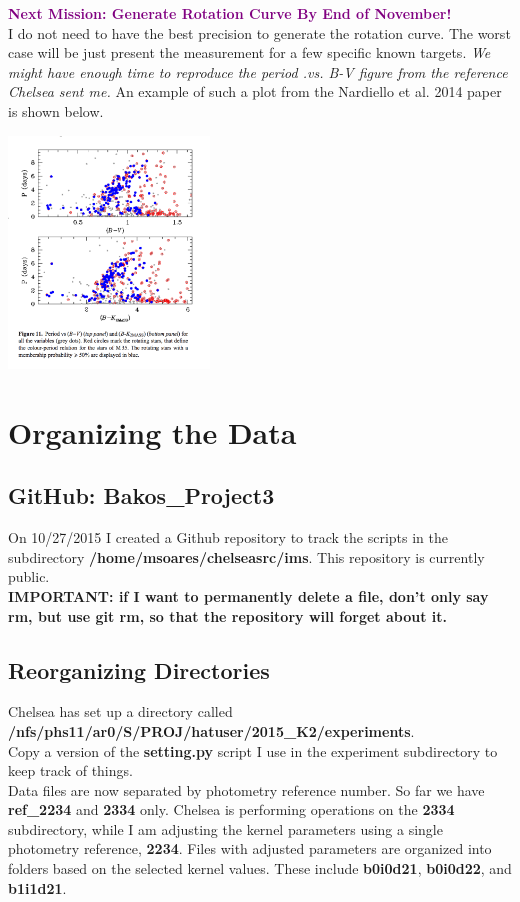 \documentclass[11pt,letterpaper]{book} %
\begin{document}
\textcolor{purple}{\textbf{Next Mission: Generate Rotation Curve By End of November!}}\\ 
I do  not need to have the best precision to generate the rotation curve. The worst case will be just present the measurement for a few specific known targets. \textit{We might have enough time to reproduce the period .vs. B-V figure from the reference Chelsea sent me.} An example of such a plot from the Nardiello et al. 2014 paper is shown below. \\
\begin{center}
\includegraphics[width=0.4\textwidth]{reproduce2.png}
\end{center}

\section*{Organizing the Data}
\subsection*{GitHub: Bakos\_Project3}
On 10/27/2015 I created a Github repository to track the scripts in the subdirectory \textbf{/home/msoares/chelseasrc/ims}. This repository is currently public. \\
\textbf{IMPORTANT: if I want to permanently delete a file, don't only say \textbf{rm}, but use \textbf{git rm}, so that the repository will forget about it.}

\subsection*{Reorganizing Directories}
Chelsea has set up a directory called \textbf{/nfs/phs11/ar0/S/PROJ/hatuser/2015\_K2/experiments}.\\
Copy a version of the \textbf{setting.py} script I use in the experiment subdirectory to keep track of things. \\
Data files are now separated by photometry reference number. 
So far we have \textbf{ref\_2234} and \textbf{2334} only.
Chelsea is performing operations on the \textbf{2334} subdirectory, while I am adjusting the kernel parameters using a single photometry reference, \textbf{2234}. Files with adjusted parameters are organized into folders based on the selected kernel values. These include \textbf{b0i0d21}, \textbf{b0i0d22}, and \textbf{b1i1d21}.
\end{document}
